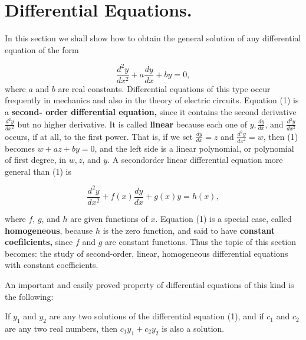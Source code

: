 \section{Differential Equations.}
 In this section we shall show how to obtain the general solution of any
differential equation of the form


\begin{equation}
\frac{d^{2}y}{dx^2} + a \frac{dy}{dx}  + by = 0, 
\label{eq6.8.1}
\end{equation}
\noindent where $a$ and $b$ are real constants. Differential equations of this type occur
frequently in mechanics and also in the theory of electric circuits. Equation (1) is a \textbf{second-
order differential equation,} since it contains the second derivative $\frac{d^{2}y}{dx^2}$ but no 
higher derivative.  It is called \textbf{linear} because each one of $y, \frac{dy}{dx}$, and $\frac{d^{2}y}{dx^2}$ occurs, if at all, to the first power. That is, if we set $\frac{dy}{dx} = z$ 
and $\frac{d^{2}y}{dx^2} = w$, then (1) becomes $w + az + by = 0$, and the left side is a
linear polynomial, or polynomial of first degree, in $w, z$, and $y$. A secondorder linear
differential equation more general than (1) is


$$
\frac{d^{2}y}{dx^2} + f(x) \frac{dy}{dx} + g(x)y  = h(x),
$$

\noindent where $f$, $g$, and $h$ are given functions of $x$. Equation (1) is a special case, 
called \textbf{homogeneous}, because $h$ is the zero function, and said to have \textbf{constant coefilcients,} since  $f$ and $g$ are constant functions. Thus the topic of this section becomes: the study of second-order, linear, homogeneous differential equations with constant coefficients.

An important and easily proved property of differential equations of this kind is the following:

\begin{theorem} %
If $y_1$ and $y_2$ are any two solutions of the differential equation (1), and if $c_1$ 
and $c_2$ are any two real numbers, then $c_{1}y_{1} + c_{2}y_{2}$ is also a solution.
\end{theorem}


